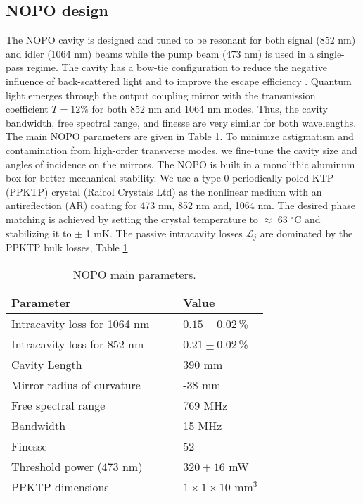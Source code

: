\documentclass[final,twocolumn,english,prl,notitlepage,nofootinbib,floatfix,longbibliography,superscriptaddress
]{revtex4-2}
\begin{document}
\subsection*{NOPO design}
The NOPO cavity is designed and tuned to be resonant for both signal (852 nm) and idler (1064 nm) beams while the pump beam (473 nm) is used in a single-pass regime. The cavity has a bow-tie configuration to reduce the negative influence of back-scattered light and to improve the escape efficiency \cite{Ou1992}. Quantum light emerges through the output coupling mirror with the transmission coefficient $T=12\%$ for both  852 nm and 1064 nm modes. Thus, the cavity bandwidth, free spectral range, and finesse are very similar for both wavelengths. The main NOPO parameters are given in Table \ref{tab:opo}.  To minimize astigmatism and contamination from high-order transverse modes, we fine-tune the cavity size and angles of incidence on the mirrors. The NOPO is built in a monolithic aluminum box for better mechanical stability. We use a type-0 periodically poled KTP (PPKTP) crystal (Raicol Crystals Ltd) as the nonlinear medium with an antireflection (AR) coating for 473 nm, 852 nm and, 1064 nm. The desired phase matching is achieved by setting the crystal temperature to $\approx$ 63 ${^\circ}$C and stabilizing it to $\pm$ 1 mK. The passive intracavity losses $\mathcal{L}_j$ are dominated by the PPKTP bulk losses, Table \ref{tab:opo}.\par
\begin{table}[ht]
\caption{NOPO main parameters.}
\label{tab:opo}
\begin{center}
\begin{tabular}{l l l l}
\hline
Parameter & & & Value    \\ \hline
Intracavity loss for 1064 nm  &  & &$0.15\pm 0.02\,$\% \\
Intracavity loss for 852 nm &  & &$0.21\pm0.02\,$\% \\
Cavity Length &  & & 390 mm\\
Mirror radius of curvature &  & & -38 mm\\
Free spectral range &  & & 769 MHz \\
Bandwidth &  & & 15 MHz\\
Finesse &  & & 52 \\
Threshold power (473 nm) & &  & $320\pm16$ mW\\
PPKTP dimensions &  &  &$1\times1\times10$ mm$^3$\\\hline
\end{tabular}
\end{center}
\end{table}
\end{document}

